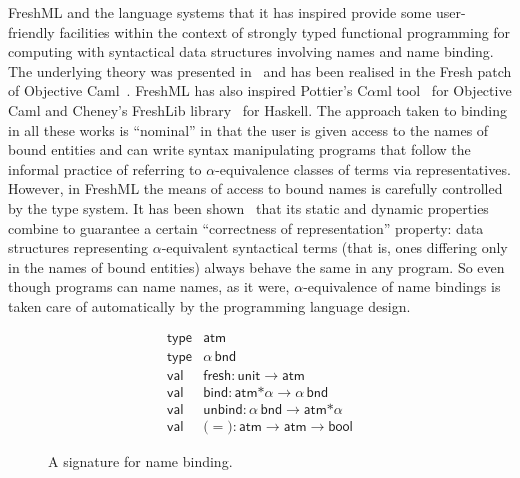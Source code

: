 \documentclass{LMCS}
\theoremstyle{plain}
\theoremstyle{definition}
\newcommand{\ATM}{\kw{atm}}
\newcommand{\BIND}{\kw{bind}}
\newcommand{\BINDTY}{\kw{bnd}}
\newcommand{\BOOL}{\kw{bool}}
\newcommand{\EQ}{\mathbin{\kw{=}}}
\newcommand{\FRESH}{\kw{fresh}}
\newcommand{\FUNTY}{\mathbin{\rightarrow}}
\newcommand{\LP}{\mathopen{\kw{(}}}
\newcommand{\kw}[1]{\mathsf{#1}}
\newcommand{\OFTY}{\mathrel{\kw{:}}}
\newcommand{\PRODTY}{\mathbin{\kw{*}}}
\newcommand{\RP}{\mathclose{\kw{)}}}
\newcommand{\TYPE}{\kw{type}}
\newcommand{\TYVAR}{\alpha}
\newcommand{\UNBIND}{\kw{unbind}}
\newcommand{\UNIT}{\kw{unit}}
\newcommand{\VAL}{\kw{val}}
\begin{document}
FreshML and the language systems that it has inspired provide some
user-friendly facilities within the context of strongly typed
functional programming for computing with syntactical data structures
involving names and name binding.  The underlying theory was presented
in~\cite{PittsAM:metpbn,PittsAM:frepbm} and has been realised in the
Fresh patch of Objective Caml~\cite{ShinwellMR:freona}. FreshML has
also inspired Pottier's C$\alpha$ml tool~\cite{PottierF:ovec} for
Objective Caml and Cheney's FreshLib library~\cite{CheneyJ:scryn} for
Haskell. The approach taken to binding in all these works is
``nominal'' in that the user is given access to the names of bound
entities and can write syntax manipulating programs that follow the
informal practice of referring to $\alpha$-equivalence classes of
terms via representatives.  However, in FreshML the means of access to
bound names is carefully controlled by the type system.  It has been
shown~\cite{ShinwellMR:freafp,PittsAM:monsf} that its static and
dynamic properties combine to guarantee a certain ``correctness of
representation'' property: data structures representing
$\alpha$-equivalent syntactical terms (that is, ones differing only in
the names of bound entities) always behave the same in any program. So
even though programs can name names, as it were, $\alpha$-equivalence
of name bindings is taken care of automatically by the programming
language design.

\begin{figure}
  \centering
  \[
  \begin{array}{ll}
    \TYPE &\ATM\\
    \TYPE &\TYVAR\,\BINDTY\\
    \VAL  &\FRESH\OFTY\UNIT\FUNTY\ATM\\
    \VAL  &\BIND\OFTY\ATM\PRODTY\TYVAR\FUNTY\TYVAR\,\BINDTY\\
    \VAL  &\UNBIND\OFTY\TYVAR\,\BINDTY\FUNTY\ATM\PRODTY\TYVAR\\
    \VAL  &\LP\EQ\RP\OFTY\ATM\FUNTY\ATM\FUNTY\BOOL
  \end{array}
  \]
  \caption{A signature for name binding.}
  \label{fig:signb}
\end{figure}
\end{document}
